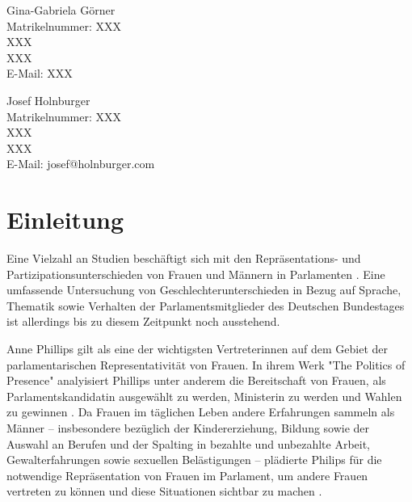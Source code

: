 \documentclass[12pt, 
    twoside=false, 
    bibliography=totoc, 
    numbers=endperiod, 
    headings=normal, 
    toc=chapterentrydotfill
    ]{scrbook}
\begin{document}
\begin{titlepage}
	\begin{minipage}[t]{0.48\textwidth}
    \flushleft 
    Gina-Gabriela Görner \\
    Matrikelnummer: XXX \\
    XXX \vspace{0.1cm} \\ 
	XXX \vspace{0.1cm}  \\
	E-Mail: XXX \\ 
    \end{minipage}
    \begin{minipage}[t]{0.48\textwidth}
	\flushleft
	Josef Holnburger \\
	Matrikelnummer: XXX \\
	XXX \vspace{0.1cm} \\
	XXX \vspace{0.1cm} \\
	E-Mail: josef@holnburger.com \\
    \end{minipage}

\end{titlepage}

\frontmatter

\tableofcontents

\listoffigures
{}
\vspace*{24pt}
{\let\clearpage\relax \listoftables}	

\mainmatter


\chapter{Einleitung}\label{Einleitung} 

Eine Vielzahl an Studien beschäftigt sich mit den Repräsentations- und Partizipationsunterschieden von Frauen und Männern in Parlamenten \parencite[416]{blaxill_2016}. Eine umfassende Untersuchung von Geschlechterunterschieden in Bezug auf Sprache, Thematik sowie Verhalten der Parlamentsmitglieder des Deutschen Bundestages ist allerdings bis zu diesem Zeitpunkt noch ausstehend. 

Anne Phillips gilt als eine der wichtigsten Vertreterinnen auf dem Gebiet der parlamentarischen Representativität von Frauen. In ihrem Werk "The Politics of Presence" analyisiert Phillips \parencite*{phillips_1998} unter anderem die Bereitschaft von Frauen, als Parlamentskandidatin ausgewählt zu werden, Ministerin zu werden und Wahlen zu gewinnen \parencite[vgl.][416f.]{blaxill_2016}. 
Da Frauen im täglichen Leben andere Erfahrungen sammeln als Männer -- insbesondere bezüglich der Kindererziehung, Bildung sowie der Auswahl an Berufen und der Spalting in bezahlte und unbezahlte Arbeit, Gewalterfahrungen sowie sexuellen Belästigungen -- plädierte Philips für die notwendige Repräsentation von Frauen im Parlament, um andere Frauen vertreten zu können und diese Situationen sichtbar zu machen \parencite[vgl.][52]{wangnerud_2009}.
\end{document}
